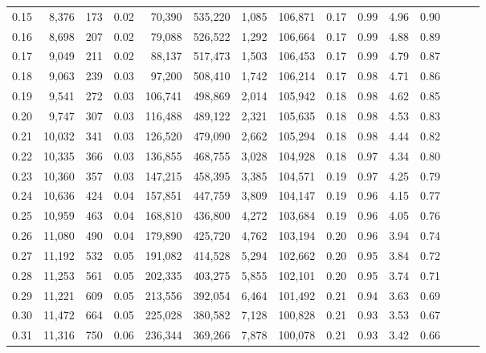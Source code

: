 \begin{tabular}{rrrrrrrrrrrrrrr}
0.15 &   8,376 &    173 &  0.02 &   70,390 &  535,220 &    1,085 &  106,871 &  0.17 &  0.99 &  4.96 &      0.90 \\
0.16 &   8,698 &    207 &  0.02 &   79,088 &  526,522 &    1,292 &  106,664 &  0.17 &  0.99 &  4.88 &      0.89 \\
0.17 &   9,049 &    211 &  0.02 &   88,137 &  517,473 &    1,503 &  106,453 &  0.17 &  0.99 &  4.79 &      0.87 \\
0.18 &   9,063 &    239 &  0.03 &   97,200 &  508,410 &    1,742 &  106,214 &  0.17 &  0.98 &  4.71 &      0.86 \\
0.19 &   9,541 &    272 &  0.03 &  106,741 &  498,869 &    2,014 &  105,942 &  0.18 &  0.98 &  4.62 &      0.85 \\
0.20 &   9,747 &    307 &  0.03 &  116,488 &  489,122 &    2,321 &  105,635 &  0.18 &  0.98 &  4.53 &      0.83 \\
0.21 &  10,032 &    341 &  0.03 &  126,520 &  479,090 &    2,662 &  105,294 &  0.18 &  0.98 &  4.44 &      0.82 \\
0.22 &  10,335 &    366 &  0.03 &  136,855 &  468,755 &    3,028 &  104,928 &  0.18 &  0.97 &  4.34 &      0.80 \\
0.23 &  10,360 &    357 &  0.03 &  147,215 &  458,395 &    3,385 &  104,571 &  0.19 &  0.97 &  4.25 &      0.79 \\
0.24 &  10,636 &    424 &  0.04 &  157,851 &  447,759 &    3,809 &  104,147 &  0.19 &  0.96 &  4.15 &      0.77 \\
0.25 &  10,959 &    463 &  0.04 &  168,810 &  436,800 &    4,272 &  103,684 &  0.19 &  0.96 &  4.05 &      0.76 \\
0.26 &  11,080 &    490 &  0.04 &  179,890 &  425,720 &    4,762 &  103,194 &  0.20 &  0.96 &  3.94 &      0.74 \\
0.27 &  11,192 &    532 &  0.05 &  191,082 &  414,528 &    5,294 &  102,662 &  0.20 &  0.95 &  3.84 &      0.72 \\
0.28 &  11,253 &    561 &  0.05 &  202,335 &  403,275 &    5,855 &  102,101 &  0.20 &  0.95 &  3.74 &      0.71 \\
0.29 &  11,221 &    609 &  0.05 &  213,556 &  392,054 &    6,464 &  101,492 &  0.21 &  0.94 &  3.63 &      0.69 \\
0.30 &  11,472 &    664 &  0.05 &  225,028 &  380,582 &    7,128 &  100,828 &  0.21 &  0.93 &  3.53 &      0.67 \\
0.31 &  11,316 &    750 &  0.06 &  236,344 &  369,266 &    7,878 &  100,078 &  0.21 &  0.93 &  3.42 &      0.66 \\

\end{tabular}
